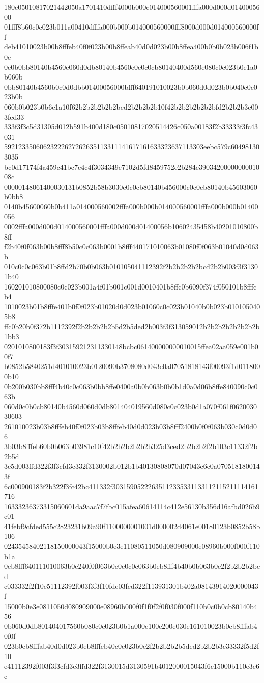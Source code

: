 180c05010817021442050a1701410dfff4000b000c014000560001fffa000d000d0140005600
01fff8b60c0c023b011a00410dfffa000b000b014000560000fff8000d000d014000560000ff
deb41010023b00b8fffeb40f0f023b00b8ffeab40d0d023b00b8ffea400b0b0b023b006f1b0e
0c0b0bb80140b4560e060d0db80140b4560e0c0c0cb80140400d560e080c0c023b0e1a0b060b
0bb80140b4560b0c0d0dbb01400056000bfff640191010023b0b060d0d023b0b040c0c023b0b
060b0b023b0b6e1a10f62b2b2b2b2b2bed2b2b2b2b10f42b2b2b2b2b2bfd2b2b2b3c003fed33
333f3f3c5d31305d012b591b400d180c05010817020514426c050a00183f2b33333f3fc43031
59212335060623222627262635113311141617161633323637113303eebc579c604981303035
bc0d17174f4a459c41bc7c4c4f3034349e7102d5fd8459752c2b284e3903420000000001008c
00000148061400030131b0852b58b3030c0c0cb80140b456000c0c0cb80140b45603060b0bb8
0140b45600060b0b411a014000560002fffa000b000b014000560001fffa000b000b01400056
0002fffa000d000d014000560001fffa000d000d01400056b10602435458b40201010800b8ff
f2b40f0f063b00b8fff8b50c0c063b0001b8fff440171010063b01080f0f063b01040d0d063b
010c0c0c063b01b8ffd2b70b0b063b010105041112392f2b2b2b2b2bcd2b2b003f3f31301b40
160201010800080c0c023b001a4f01b001c001d0010401b8ffc0b6090f374f050101b8fffcb4
1010023b01b8fffe401b0f0f023b01020d0d023b01060c0c023b01040b0b023b0101050405b8
ffc0b20b0f372b1112392f2b2b2b2b2b5d2b5ded2b003f3f313059012b2b2b2b2b2b2b2b1bb3
0201010800183f3f303159212311330148bcbc061400000000010015ffea02aa059e001b00f7
b0852b5840251d401010023b0120090b3708080d043e0a07051818143f00093f1d0118000b10
0b200b030bb8fff4b40c0c063b0bb8ffe0400a0b0b063b0b0b1d0a0d06b8ffe840090c0c063b
060d0c0b0cb80140b4560d060d0db801404019560d080c0c023b0d1a070f061f062003030603
261010023b03b8fffeb40f0f023b03b8fffeb40d0d023b03b8fff2400b0f0f063b030c0d0d06
3b03b8fffeb60b0b063b03981c10f42b2b2b2b2b2b325d3ced2b2b2b2f2b103c11332f2b2b5d
3c5d003ffd322f3f3cfd3c332f3130002b012b1b40130808070d07043e6c0a0705181800143f
6c000900183f2b322f3fc42bc411332f30315905222635112335331133112115211114161716
16333236373315060601da9aac7f7fbc015afea60614114c412e56130b356d16afbd026b9c01
41febf9cfded555c2823231b09a90f1100000001001d000002d4061e00180123b0852b58b106
02435458402118150000043f15000b0e3e11080511050d080909000e08960b000f000f110b1a
0eb8fff640111010063b0e240f0f063b0e0c0c0c063b0eb8fff4b40b0b063b0e2f2b2b2b2bed
c033332f2f10e51112392f003f3f3f10fdc03fed322f113931301b402a08143914020000043f
15000b0e3e0811050d080909000e08960b000f0f1f0f2f0f030f000f110b0c0b0cb80140b456
0b060d0db801404017560b080c0c023b0b1a000e100e200e030e161010023b0eb8fffab40f0f
023b0eb8fffab40d0d023b0eb8fffeb40c0c023b0e2f2b2b2b2b5ded2b2b2b3c33332f5d2f10
e41112392f003f3f3cfd3c3ffd322f3130015d3130591b4012000015043f6c15000b110e3e6c
